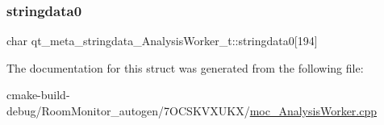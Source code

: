 \subsubsection{\texorpdfstring{stringdata0}{stringdata0}}
{\footnotesize\ttfamily char qt\+\_\+meta\+\_\+stringdata\+\_\+\+Analysis\+Worker\+\_\+t\+::stringdata0\mbox{[}194\mbox{]}}



The documentation for this struct was generated from the following file\+:\begin{DoxyCompactItemize}
\item 
cmake-\/build-\/debug/\+Room\+Monitor\+\_\+autogen/7\+O\+C\+S\+K\+V\+X\+U\+K\+X/\hyperlink{moc___analysis_worker_8cpp}{moc\+\_\+\+Analysis\+Worker.\+cpp}\end{DoxyCompactItemize}
